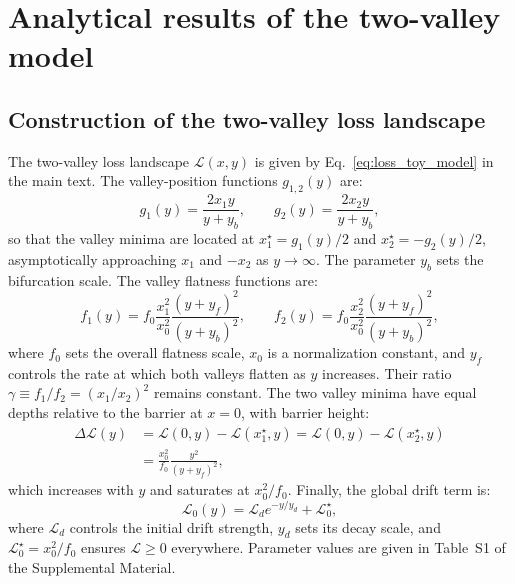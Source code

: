 \documentclass[aps,prx,reprint,superscriptaddress,longbibliography,nofootinbib,floatfix]{revtex4-2}
\begin{document}
\appendix

\setcounter{equation}{0}
\renewcommand{\theequation}{A\arabic{equation}}

\section{Analytical results of the two-valley model}

\subsection{Construction of the two-valley loss landscape} \label{sec:appendix0}

The two-valley loss landscape $\mathcal{L}(x,y)$ is given by Eq.~\ref{eq:loss_toy_model} in the main text. The valley-position functions $g_{1,2}(y)$ are:
\begin{equation}
    g_1(y) = \frac{2 x_1 y}{y + y_b}, \qquad
    g_2(y) = \frac{2 x_2 y}{y + y_b},
\end{equation}
so that the valley minima are located at $x_1^{\star} = g_1(y)/2$ and $x_2^{\star} = -g_2(y)/2$, asymptotically approaching $x_1$ and $-x_2$ as $y \to \infty$. The parameter $y_b$ sets the bifurcation scale. The valley flatness functions are:
\begin{equation}
    f_1(y) = f_0 \frac{x_1^2}{x_0^2} \frac{(y+y_f)^2}{(y+y_b)^2},
    \qquad
    f_2(y) = f_0 \frac{x_2^2}{x_0^2} \frac{(y+y_f)^2}{(y+y_b)^2},
\end{equation}
where $f_0$ sets the overall flatness scale, $x_0$ is a normalization constant, and $y_f$ controls the rate at which both valleys flatten as $y$ increases. Their ratio $\gamma \equiv f_1/f_2 = (x_1/x_2)^2$ remains constant. The two valley minima have equal depths relative to the barrier at $x=0$, with barrier height:
\begin{equation}
\begin{split}
    \Delta \mathcal{L}(y)
    &= \mathcal{L}(0, y) - \mathcal{L}(x_1^{\star}, y)
     = \mathcal{L}(0, y) - \mathcal{L}(x_2^{\star}, y)  \\
    &= \frac{x_0^2}{f_0} \frac{y^2}{(y+y_f)^2},
\end{split}
\end{equation}
which increases with $y$ and saturates at $x_0^2/f_0$. Finally, the global drift term is:
\begin{equation}
    \mathcal{L}_0(y) = \mathcal{L}_d e^{-y / y_d} + \mathcal{L}_0^{\star},
\end{equation}
where $\mathcal{L}_d$ controls the initial drift strength, $y_d$ sets its decay scale, and $\mathcal{L}_0^{\star} = x_0^2 / f_0$ ensures $\mathcal{L} \ge 0$ everywhere. Parameter values are given in Table~S1 of the Supplemental Material.
\end{document}
